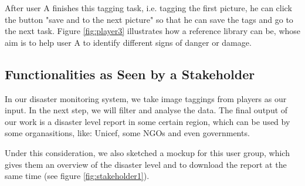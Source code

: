       After user A finishes this tagging task,
      i.e.
      tagging the first picture,
      he can click the button "save and to the next picture" so that he can save the tags and go to the next task.
      Figure \ref{fig:player3} illustrates how a reference library can be,
      whose aim is to help user A to identify different signs of danger or damage.

    \subsection{Functionalities as Seen by a Stakeholder}
      In our disaster monitoring system, 
      we take image taggings from players as our input. 
      In the next step, 
      we will filter and analyse the data.
      The final output of our work is a disaster level report in some certain region,
      which can be used by some organasitions,
      like: Unicef, some NGOs and even governments.

      Under this consideration, 
      we also sketched a mockup for this user group,
      which gives them an overview of the disaster level and to download the report at the same time (see figure \ref{fig:stakeholder1}).

